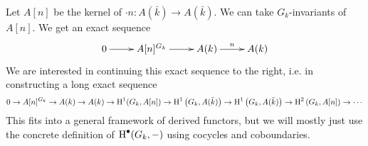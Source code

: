 \documentclass{article}
\begin{document}
Let $A[n]$ be the kernel of $\cdot n : A(\bar k)\to A(\bar k)$. We can take 
$G_k$-invariants of $A[n]$. We get an exact sequence 
\[\xymatrix{
  0 \ar[r] 
    & A[n]^{G_k} \ar[r] 
    & A(k) \ar[r]^-n 
    & A(k)
}\]
We are interested in continuing this exact sequence to the right, i.e. in 
constructing a long exact sequence 
\[
  0 \to A[n]^{G_k} \to A(k) \to A(k) \to \operatorname{H}^1(G_k,A[n]) \to \operatorname{H}^1\left(G_k,A(\bar k)\right)\to \operatorname{H}^1\left(G_k, A(\bar k)\right) \to \operatorname{H}^2\left(G_k, A[n]\right) \to \cdots
\]
This fits into a general framework of derived functors, but we will mostly 
just use the concrete definition of $\operatorname{H}^\bullet(G_k,-)$ using cocycles and 
coboundaries. 












\end{document}
